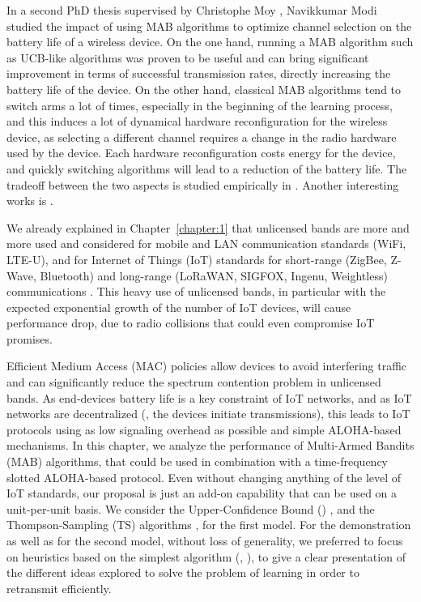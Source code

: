 In a second PhD thesis supervised by Christophe Moy \cite{Modi17PhD}, Navikkumar Modi studied the impact
of using MAB algorithms to optimize channel selection
on the battery life of a wireless device.
On the one hand, running a MAB algorithm such as UCB-like algorithms was proven to be useful and can bring significant improvement in terms of successful transmission rates, directly increasing the battery life of the device.
On the other hand, classical MAB algorithms tend to switch arms a lot of times, especially in the beginning of the learning process, and this induces a lot of dynamical hardware reconfiguration for the wireless device, as selecting a different channel requires a change in the radio hardware used by the device.
Each hardware reconfiguration costs energy for the device, and quickly switching algorithms will lead to a reduction of the battery life.
The tradeoff between the two aspects is studied empirically in
\cite{modiDemo2016}.
%
Another interesting works is \cite{Modi17QoS}.


We already explained in Chapter~\ref{chapter:1} that
unlicensed bands are more and more used and considered for mobile and LAN communication standards (WiFi, LTE-U), and for Internet of Things (IoT) standards for short-range (ZigBee, Z-Wave, Bluetooth) and long-range (LoRaWAN, SIGFOX, Ingenu, Weightless) communications \cite{Centenaro16}.
This heavy use of unlicensed bands, in particular with the expected exponential growth of the number of IoT devices, will cause performance drop, due to radio collisions that could even compromise IoT promises.

Efficient Medium Access (MAC) policies allow devices to avoid interfering traffic and can significantly reduce the spectrum contention problem in unlicensed bands.
As end-devices battery life is a key constraint of IoT networks,
and as IoT networks are decentralized (\ie, the devices initiate transmissions),
this leads to IoT protocols using as low signaling overhead as possible and simple ALOHA-based mechanisms.
%
In this chapter, we analyze the performance of Multi-Armed Bandits (MAB) algorithms, that could be used in combination with a time-frequency slotted ALOHA-based protocol.
Even without changing anything of the level of IoT standards, our proposal is just an add-on capability that can be used on a unit-per-unit basis.
We consider the Upper-Confidence Bound (\UCB) \cite{Auer02}, and the Thompson-Sampling (TS) algorithms \cite{Thompson33,AgrawalGoyal11,
Kaufmann12Thompson}, for the first model. For the demonstration as well as for the second model, without loss of generality, we preferred to focus on heuristics based on the simplest algorithm (\ie, \UCB), to give a clear presentation of the different ideas explored to solve the problem of learning in order to retransmit efficiently.

